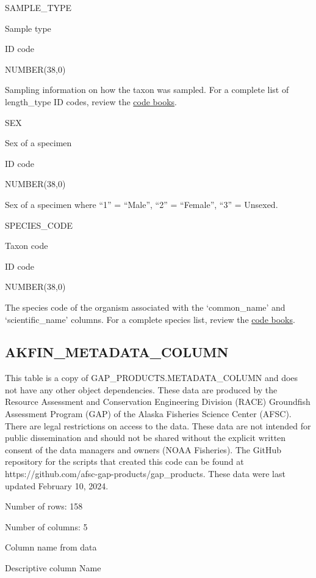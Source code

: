 \documentclass[
  letterpaper,
  oneside,
  open=any]{scrbook}
\begin{document}
SAMPLE\_TYPE

Sample type

ID code

NUMBER(38,0)

Sampling information on how the taxon was sampled. For a complete list
of length\_type ID codes, review the
\href{https://www.fisheries.noaa.gov/resource/document/groundfish-survey-species-code-manual-and-data-codes-manual}{code
books}.

SEX

Sex of a specimen

ID code

NUMBER(38,0)

Sex of a specimen where ``1'' = ``Male'', ``2'' = ``Female'', ``3'' =
Unsexed.

SPECIES\_CODE

Taxon code

ID code

NUMBER(38,0)

The species code of the organism associated with the `common\_name' and
`scientific\_name' columns. For a complete species list, review the
\href{https://www.fisheries.noaa.gov/resource/document/groundfish-survey-species-code-manual-and-data-codes-manual}{code
books}.

\hypertarget{akfin_metadata_column}{%
\subsection{AKFIN\_METADATA\_COLUMN}\label{akfin_metadata_column}}

This table is a copy of GAP\_PRODUCTS.METADATA\_COLUMN and does not have
any other object dependencies. These data are produced by the Resource
Assessment and Conservation Engineering Division (RACE) Groundfish
Assessment Program (GAP) of the Alaska Fisheries Science Center (AFSC).
There are legal restrictions on access to the data. These data are not
intended for public dissemination and should not be shared without the
explicit written consent of the data managers and owners (NOAA
Fisheries). The GitHub repository for the scripts that created this code
can be found at https://github.com/afsc-gap-products/gap\_products.
These data were last updated February 10, 2024.

Number of rows: 158

Number of columns: 5

Column name from data

Descriptive column Name
\end{document}
